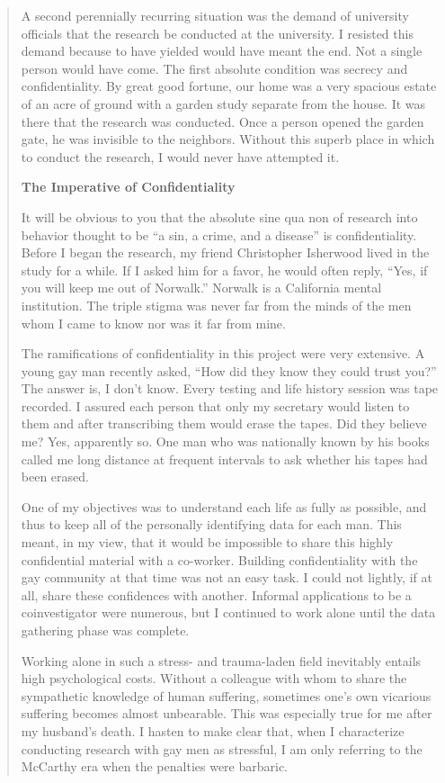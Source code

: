 \begin{refsection}
\begin{quote}
A second perennially recurring situation was the demand of university officials that the research be conducted at the university. I resisted this demand because to have yielded would have meant the end. Not a single person would have come. The first absolute condition was secrecy and confidentiality. By great good fortune, our home was a very spacious estate of an acre of ground with a garden study separate from the house. It was there that the research was conducted. Once a person opened the garden gate, he was invisible to the neighbors. Without this superb place in which to conduct the research, I would never have attempted it.

\textbf{The Imperative of Confidentiality}

It will be obvious to you that the absolute sine qua non of research into behavior thought to be ``a sin, a crime, and a disease'' is confidentiality. Before I began the research, my friend Christopher Isherwood lived in the study for a while. If I asked him for a favor, he would often reply, ``Yes, if you will keep me out of Norwalk.'' Norwalk is a California mental institution. The triple stigma was never far from the minds of the men whom I came to know nor was it far from mine.

The ramifications of confidentiality in this project were very extensive. A young gay man recently asked, ``How did they know they could trust you?'' The answer is, I don't know. Every testing and life history session was tape recorded. I assured each person that only my secretary would listen to them and after transcribing them would erase the tapes. Did they believe me? Yes, apparently so. One man who was nationally known by his books called me long distance at frequent intervals to ask whether his tapes had been erased.

One of my objectives was to understand each life as fully as possible, and thus to keep all of the personally identifying data for each man. This meant, in my view, that it would be impossible to share this highly confidential material with a co-worker. Building confidentiality with the gay community at that time was not an easy task. I could not lightly, if at all, share these confidences with another. Informal applications to be a coinvestigator were numerous, but I continued to work alone until the data gathering phase was complete.

Working alone in such a stress- and trauma-laden field inevitably entails high psychological costs. Without a colleague with whom to share the sympathetic knowledge of human suffering, sometimes one's own vicarious suffering becomes almost unbearable. This was especially true for me after my husband's death. I hasten to make clear that, when I characterize conducting research with gay men as stressful, I am only referring to the McCarthy era when the penalties were barbaric.


\end{quote}
\end{refsection}
